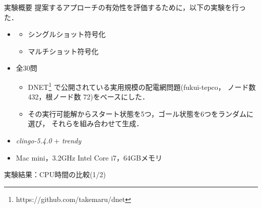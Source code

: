 \documentclass[dvipdfmx,11pt]{beamer}
\begin{document}
\begin{frame}{実験概要}
\renewcommand{\thefootnote}{\fnsymbol{footnote}}
\setcounter{footnote}{1}
提案するアプローチの有効性を評価するために，以下の実験を行った．

\begin{itemize}
 \item {}
	   \begin{itemize}
		\item シングルショット符号化
		\item マルチショット符号化
	   \end{itemize}
 \item {} 全30問
	   \begin{itemize}
		\item DNET\footnote{https://github.com/takemaru/dnet}
			  で公開されている実用規模の配電網問題(\textsf{fukui-tepco}，
			  ノード数 432，根ノード数 72)をベースにした．
		\item その実行可能解からスタート状態を5つ，ゴール状態を6つをランダムに選び，
			 それらを組み合わせて生成．
	   \end{itemize}
 \item {} \textit{clingo-5.4.0} $+$ \textit{trendy}
 \item {} Mac mini，3.2GHz Intel Core i7，64GBメモリ
\end{itemize}

\end{frame}

\begin{frame}{実験結果：CPU時間の比較(1/2)}
 \centering
 \scalebox{0.8}{}
\end{frame}

\end{document}
